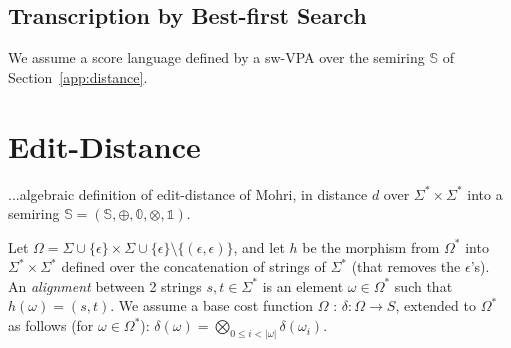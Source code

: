 \documentclass[runningheads]{llncs}
\newcommand{\Semiring}{\mathbb{S}}
\newcommand{\zero}{\mathbb{0}}
\newcommand{\one}{\mathbb{1}}
\def\SWVPA{\textsf{sw-VPA}\xspace}
\begin{document}
\subsection{Transcription by Best-first Search}
We assume a score language defined by a \SWVPA over the semiring 
$\Semiring$ of Section~\ref{app:distance}.






%
% 

%






\newpage
\appendix 

\section{Edit-Distance}

...algebraic definition of edit-distance of Mohri, in \cite{Mohri03EDWA}
distance $d$ over $\Sigma^* \times \Sigma^*$ 
into a semiring  $\Semiring = ( \Semiring, \oplus, \zero, \otimes, \one)$.

Let $\Omega = \Sigma \cup \{ \epsilon \} \times \Sigma \cup \{ \epsilon \} \setminus \{ (\epsilon, \epsilon) \}$,
and let $h$ be the morphism from $\Omega^*$ into $\Sigma^* \times \Sigma^*$  
defined over the concatenation of strings of $\Sigma^*$ (that removes the $\epsilon$'s).
%
\noindent
An \emph{alignment} between 2 strings  $s, t \in \Sigma^*$ is an element $\omega \in \Omega^*$ 
such that $h(\omega) = (s, t)$.
%
\noindent
We assume a base cost function $\Omega$ : $\delta: \Omega \to S$, extended to $\Omega^*$ as follows  
(for $\omega \in \Omega^*$): 
\(
\displaystyle\delta(\omega) = \bigotimes_{0 \leq i < |\omega|} \delta(\omega_i)
\).
\end{document}
